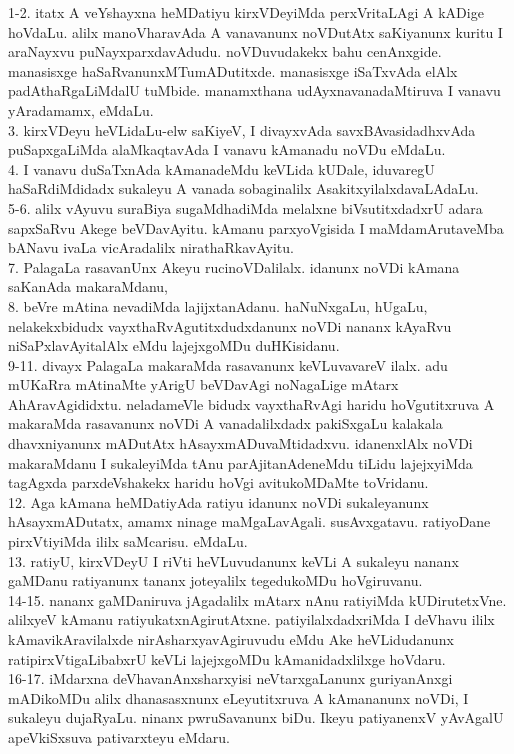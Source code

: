 \documentclass{article}
\begin{document}
1-2. itatx A veYshayxna heMDatiyu kirxVDeyiMda perxVritaLAgi A kADige hoVdaLu. alilx manoVharavAda A vanavanunx noVDutAtx saKiyanunx kuritu I araNayxvu puNayxparxdavAdudu. noVDuvudakekx bahu cenAnxgide. manasisxge haSaRvanunxMTumADutitxde. manasisxge iSaTxvAda elAlx padAthaRgaLiMdalU tuMbide. manamxthana udAyxnavanadaMtiruva I vanavu yAradamamx, eMdaLu.\\
3. kirxVDeyu heVLidaLu-elw saKiyeV, I divayxvAda savxBAvasidadhxvAda puSapxgaLiMda alaMkaqtavAda I vanavu kAmanadu noVDu eMdaLu.\\
4. I vanavu duSaTxnAda kAmanadeMdu keVLida kUDale, iduvaregU haSaRdiMdidadx sukaleyu A vanada sobaginalilx AsakitxyilalxdavaLAdaLu.\\
5-6. alilx vAyuvu suraBiya sugaMdhadiMda melalxne biVsutitxdadxrU adara sapxSaRvu Akege beVDavAyitu. kAmanu parxyoVgisida I maMdamArutaveMba bANavu ivaLa vicAradalilx nirathaRkavAyitu.\\
7. PalagaLa rasavanUnx Akeyu rucinoVDalilalx. idanunx noVDi kAmana saKanAda makaraMdanu,\\
8. beVre mAtina nevadiMda lajijxtanAdanu. haNuNxgaLu, hUgaLu, nelakekxbidudx vayxthaRvAgutitxdudxdanunx noVDi nananx kAyaRvu niSaPxlavAyitalAlx eMdu lajejxgoMDu duHKisidanu.\\
9-11. divayx PalagaLa makaraMda rasavanunx keVLuvavareV ilalx. adu mUKaRra mAtinaMte yArigU beVDavAgi noNagaLige mAtarx AhAravAgididxtu. neladameVle bidudx vayxthaRvAgi haridu hoVgutitxruva A makaraMda rasavanunx noVDi A vanadalilxdadx pakiSxgaLu kalakala dhavxniyanunx mADutAtx hAsayxmADuvaMtidadxvu. idanenxlAlx noVDi makaraMdanu I sukaleyiMda tAnu parAjitanAdeneMdu tiLidu lajejxyiMda tagAgxda parxdeVshakekx haridu hoVgi avitukoMDaMte toVridanu.\\
12. Aga kAmana heMDatiyAda ratiyu idanunx noVDi sukaleyanunx hAsayxmADutatx, amamx ninage maMgaLavAgali. susAvxgatavu. ratiyoDane pirxVtiyiMda ililx saMcarisu. eMdaLu.\\
13. ratiyU, kirxVDeyU I riVti heVLuvudanunx keVLi A sukaleyu nananx gaMDanu ratiyanunx tananx joteyalilx tegedukoMDu hoVgiruvanu.\\
14-15. nananx gaMDaniruva jAgadalilx mAtarx nAnu ratiyiMda kUDirutetxVne. alilxyeV kAmanu ratiyukatxnAgirutAtxne. patiyilalxdadxriMda I deVhavu ililx kAmavikAravilalxde nirAsharxyavAgiruvudu eMdu Ake heVLidudanunx ratipirxVtigaLibabxrU keVLi lajejxgoMDu kAmanidadxlilxge hoVdaru.\\
16-17. iMdarxna deVhavanAnxsharxyisi neVtarxgaLanunx guriyanAnxgi mADikoMDu alilx dhanasasxnunx eLeyutitxruva A kAmananunx noVDi, I sukaleyu dujaRyaLu. ninanx pwruSavanunx biDu. Ikeyu patiyanenxV yAvAgalU apeVkiSxsuva pativarxteyu eMdaru.\\
\end{document}
